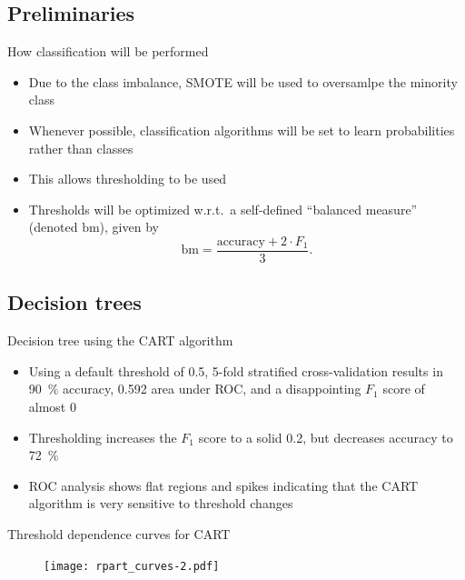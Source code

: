 \documentclass[serif, hyperref={unicode}, xcolor={x11names, psnames, dvipsnames,
  table}, usepdftitle=false]{beamer}
\begin{document}
\subsection{Preliminaries}
\begin{frame}{How classification will be performed}
  \begin{itemize}
  \item Due to the class imbalance, SMOTE will be used to oversamlpe the
    minority class
  \item Whenever possible, classification algorithms will be set to learn
    probabilities rather than classes
  \item This allows thresholding to be used
  \item Thresholds will be optimized w.r.t.\ a self-defined ``balanced measure''
    (denoted $\mathrm{bm}$), given by
    \begin{equation}
      \mathrm{bm} = \frac{\mathrm{accuracy} + 2 \cdot F_1}{3}\text{.}
    \end{equation}
  \end{itemize}
\end{frame}

\subsection{Decision trees}
\begin{frame}{Decision tree using the CART algorithm}
  \begin{itemize}
  \item Using a default threshold of \num{0.5}, 5-fold stratified
    cross-validation results in \SI{90}{\percent} accuracy, \num{0.592} area
    under ROC, and a disappointing $F_1$ score of almost \num{0}
  \item Thresholding increases the $F_1$ score to a solid \num{0.2}, but
    decreases accuracy to \SI{72}{\percent}
  \item ROC analysis shows flat regions and spikes indicating that the CART
    algorithm is very sensitive to threshold changes
  \end{itemize}
\end{frame}

\begin{frame}{Threshold dependence curves for CART}
  \begin{figure}[!h]
    \texttt{[image: rpart\_curves-2.pdf]}
  \end{figure}
\end{frame}
\end{document}
